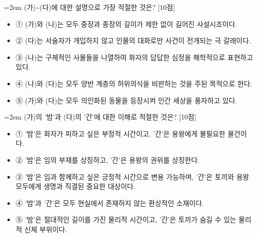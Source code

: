 \documentclass[11pt,a4paper]{article}
\newcommand{\qnum}[1]{%
  \tikz[baseline=(num.base)]{%
    \node[circle, fill=numCircle, text=white, inner sep=0pt,
          minimum size=18pt, font=\small\bfseries] (num) {#1};%
  }%
}
\newcommand{\pts}[1]{%
  \hfill\textcolor{ptsBadge}{[#1점]}%
}
\begin{document}
\vspace{3mm}
\begin{minipage}{\columnwidth}
{\hangindent=2em
\qnum{33}\enspace (가)\textasciitilde{}(다)에 대한 설명으로 가장 적절한 것은? \pts{10}
\par}

\vspace{3mm}
\begin{itemize}[leftmargin=2.5em, labelsep=0.3em, label={}, itemsep=4pt, parsep=1pt, topsep=0pt]
  \item ① (가)와 (나)는 모두 중장과 종장의 길이가 제한 없이 길어진 사설시조이다.
  \item ② (다)는 서술자가 개입하지 않고 인물의 대화로만 사건이 전개되는 극 갈래이다.
  \item ③ (나)는 구체적인 사물들을 나열하여 화자의 답답한 심정을 해학적으로 표현하고 있다.
  \item ④ (나)와 (다)는 모두 양반 계층의 허위의식을 비판하는 것을 주된 목적으로 한다.
  \item ⑤ (가)와 (다)는 모두 의인화된 동물을 등장시켜 인간 세상을 풍자하고 있다.
\end{itemize}
\end{minipage}
\vspace{4mm}

\vspace{4mm}
\begin{minipage}{\columnwidth}
{\hangindent=2em
\qnum{34}\enspace (가)의 '밤'과 (다)의 '간'에 대한 이해로 적절한 것은? \pts{10}
\par}

\vspace{3mm}
\begin{itemize}[leftmargin=2.5em, labelsep=0.3em, label={}, itemsep=4pt, parsep=1pt, topsep=0pt]
  \item ① '밤'은 화자가 피하고 싶은 부정적 시간이고, '간'은 용왕에게 불필요한 물건이다.
  \item ② '밤'은 임의 부재를 상징하고, '간'은 용왕의 권위를 상징한다.
  \item ③ '밤'은 임과 함께하고 싶은 긍정적 시간으로 변용 가능하며, '간'은 토끼와 용왕 모두에게 생명과 직결된 중요한 대상이다.
  \item ④ '밤'과 '간'은 모두 현실에서 존재하지 않는 환상적인 소재이다.
  \item ⑤ '밤'은 절대적인 길이를 가진 물리적 시간이고, '간'은 토끼가 숨길 수 있는 물리적 신체 부위이다.
\end{itemize}
\end{minipage}
\vspace{4mm}
\end{document}
